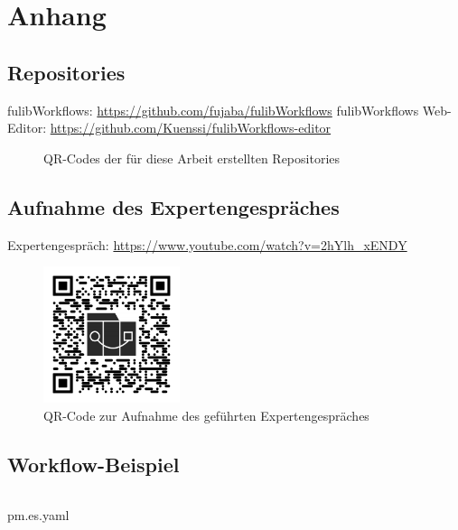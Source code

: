 \chapter*{Anhang}


\section{Repositories}\label{sec:repositories}
fulibWorkflows: \url{https://github.com/fujaba/fulibWorkflows}\newline
fulibWorkflows Web-Editor: \url{https://github.com/Kuenssi/fulibWorkflows-editor}
\begin{figure}[!ht]%
    \centering
    \qquad
    \caption{QR-Codes der für diese Arbeit erstellten Repositories}%
    \label{fig:repos}%
\end{figure}

\section{Aufnahme des Expertengespräches}\label{sec:aufnahme-des-expertengespräches}
Expertengespräch: \url{https://www.youtube.com/watch?v=2hYlh_xENDY}
\begin{figure}[!ht]
    \centering
    \includegraphics[width=4cm,height=4cm]{images/appendix/qr-rec}
    \caption{QR-Code zur Aufnahme des geführten Expertengespräches}
    \label{fig:rec}
\end{figure}

\newpage

\section{Workflow-Beispiel}\label{sec:workflow-beispiel}
\begin{listing}[!ht]
    \inputminted{yaml}{listings/appendix/pm.es.yaml}
    \caption{pm.es.yaml}
    \label{listing:pm-yaml}
\end{listing}
